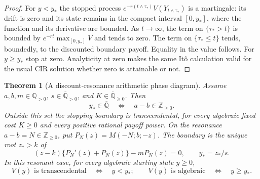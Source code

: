\documentclass[11pt,a4paper]{article}
\newtheorem{theorem}{Theorem}[section]
\theoremstyle{definition}
\theoremstyle{remark}
\numberwithin{equation}{section}
\begin{document}
\begin{proof}
For $y<y_*$ the stopped process
$e^{-r(t\wedge\tau_*)}V(Y_{t\wedge\tau_*})$ is a martingale:
its drift is zero and its state remains in the compact interval
$[0,y_*]$, where the function and its derivative are bounded.
As $t\to\infty$, the term on $\{\tau_*>t\}$ is bounded by
$e^{-rt}\max_{[0,y_*]}V$ and tends to zero.  The term on
$\{\tau_*\le t\}$ tends, boundedly, to the discounted boundary
payoff.  Equality in the value follows.  For $y\ge y_*$ stop at
zero.  Analyticity at zero makes the same It\^o calculation valid
for the usual CIR solution whether zero is attainable or not.
\end{proof}

\begin{theorem}[A discount-resonance arithmetic phase diagram]
\label{p1:stp:arithmetic}
Assume $a,b,m\in\mathbb Q_{>0}$, $s\in\overline{\mathbb Q}_{>0}$,
and $K\in\overline{\mathbb Q}_{\ge0}$.  Then
\begin{equation}\label{p1:stp:resonance}
 y_*\in\overline{\mathbb Q}
 \quad\Longleftrightarrow\quad
 a-b\in\mathbb Z_{\ge0}.
\end{equation}
Outside this set the stopping boundary is transcendental, for every
algebraic fixed cost $K\ge0$ and every positive rational payoff power.
On the resonance $a-b=N\in\mathbb Z_{\ge0}$, put
$P_N(z)=M(-N;b;-z)$.  The boundary is the unique root $z_*>k$ of
\begin{equation}\label{p1:stp:algebraicboundary}
 (z-k)\{P_N'(z)+P_N(z)\}-mP_N(z)=0,
 \qquad y_*=z_*/s.
\end{equation}
In this resonant case, for every algebraic starting state $y\ge0$,
\begin{equation}\label{p1:stp:stateclassification}
 V(y)\text{ is transcendental}\quad\Longleftrightarrow\quad y<y_*;
 \qquad
 V(y)\text{ is algebraic}\quad\Longleftrightarrow\quad y\ge y_*.
\end{equation}
\end{theorem}
\end{document}
